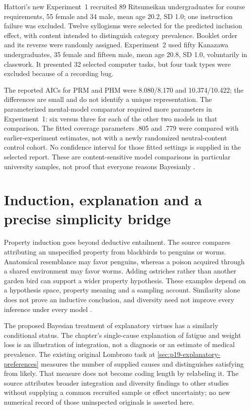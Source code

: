 Hattori's new Experiment~1 recruited 89 Ritsumeikan undergraduates for
course requirements, 55 female and 34 male, mean age 20.2, SD 1.0;
one instruction failure was excluded. Twelve syllogisms were selected
for the predicted inclusion effect, with content intended to distinguish
category prevalence. Booklet order and its reverse were randomly
assigned. Experiment~2 used fifty Kanazawa undergraduates, 35 female
and fifteen male, mean age 20.8, SD 1.0, voluntarily in classwork.
It presented 32 selected computer tasks, but four task types were
excluded because of a recording bug.

The reported AICs for PRM and PHM were 8.080/8.170 and
10.374/10.422; the differences are small and do not identify a unique
representation. The parameterized mental-model comparator required
more parameters in Experiment~1: six versus three for each of the
other two models in that comparison. The fitted coverage parameters
.805 and .779 were compared with earlier-experiment estimates, not
with a newly randomized neutral-content control cohort. No confidence
interval for those fitted settings is supplied in the selected report.
These are content-sensitive model comparisons in particular university
samples, not proof that everyone reasons Bayesianly
\cite[pp.~312--314, Tables~5--6]{Hattori2016PRM}.

\section{Induction, explanation and a precise simplicity bridge}
\label{sec:p19-r45-induction}

Property induction goes beyond deductive entailment. The source
compares attributing an unspecified property from blackbirds to
penguins or worms. Anatomical resemblance may favor penguins, whereas
a poison acquired through a shared environment may favor worms.
Adding ostriches rather than another garden bird can support a wider
property hypothesis. These examples depend on a hypothesis space,
property meaning and a sampling account. Similarity alone does not
prove an inductive conclusion, and diversity need not improve every
inference under every model \cite[p.~289]{ChaterOaksford2021BayesianReasoning}.

The proposed Bayesian treatment of explanatory virtues has a similarly
conditional status. The chapter's single-cause explanation of fatigue
and weight loss is an illustration of integration, not a diagnosis or
an estimate of medical prevalence. The existing original Lombrozo
task at \cref{sec:p19-explanatory-preferences} measures the number of
supplied causes and distinguishes satisfying from likely. That measure
does not become coding length by relabeling it. The source attributes
broader integration and diversity findings to other studies without
supplying a common recruited sample or effect uncertainty; no new
numerical record of those uninspected originals is asserted here.

